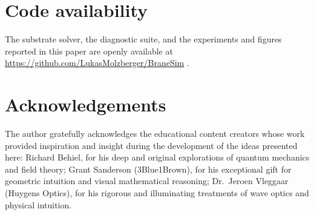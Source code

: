 \section*{Code availability}

The substrate solver, the diagnostic suite, and the experiments and figures
reported in this paper are openly available at
\url{https://github.com/LukasMolzberger/BraneSim} \citep{BraneSimRepo}.

\section*{Acknowledgements}

The author gratefully acknowledges the educational content creators whose work provided inspiration and insight during the development of the ideas presented here: Richard Behiel, for his deep and original explorations of quantum mechanics and field theory; Grant Sanderson (3Blue1Brown), for his exceptional gift for geometric intuition and visual mathematical reasoning; Dr.\ Jeroen Vleggaar (Huygens Optics), for his rigorous and illuminating treatments of wave optics and physical intuition.